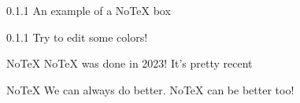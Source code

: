 \begin{example}{0.1.1}
    An example of a NoTeX box
\end{example}

\begin{exercise}{0.1.1}
    Try to edit some colors!
\end{exercise}

\begin{curiosity}{NoTeX}
    NoTeX was done in 2023! It's pretty recent
\end{curiosity}

\begin{remark}{NoTeX}
    We can always do better. NoTeX can be better too!
\end{remark}
